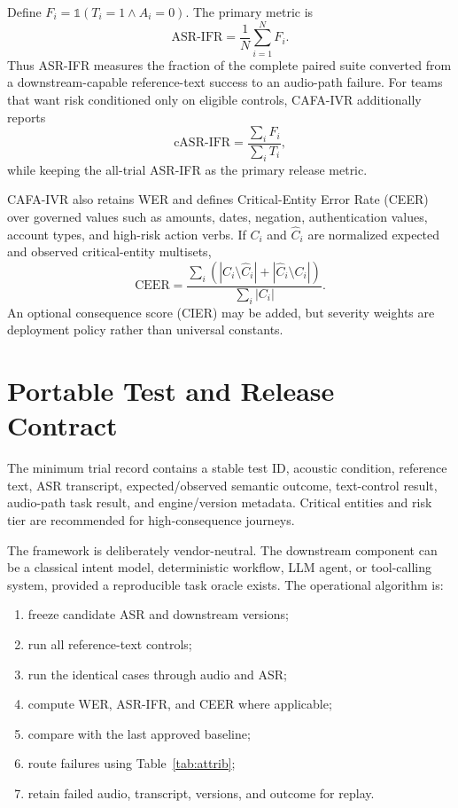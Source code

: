 \documentclass[9pt,twocolumn]{extarticle}
\begin{document}
Define $F_i=\mathbb{1}(T_i=1\land A_i=0)$. The primary metric is
\begin{equation}
\mathrm{ASR\mbox{-}IFR}=\frac{1}{N}\sum_{i=1}^{N}F_i.
\end{equation}
Thus ASR-IFR measures the fraction of the complete paired suite converted from a downstream-capable reference-text success to an audio-path failure. For teams that want risk conditioned only on eligible controls, CAFA-IVR additionally reports
\begin{equation}
\mathrm{cASR\mbox{-}IFR}=\frac{\sum_i F_i}{\sum_i T_i},
\end{equation}
while keeping the all-trial ASR-IFR as the primary release metric.

CAFA-IVR also retains WER and defines Critical-Entity Error Rate (CEER) over governed values such as amounts, dates, negation, authentication values, account types, and high-risk action verbs. If $C_i$ and $\hat C_i$ are normalized expected and observed critical-entity multisets,
\begin{equation}
\mathrm{CEER}=\frac{\sum_i (|C_i\setminus\hat C_i|+|\hat C_i\setminus C_i|)}{\sum_i |C_i|}.
\end{equation}
An optional consequence score (CIER) may be added, but severity weights are deployment policy rather than universal constants.

\section{Portable Test and Release Contract}
The minimum trial record contains a stable test ID, acoustic condition, reference text, ASR transcript, expected/observed semantic outcome, text-control result, audio-path task result, and engine/version metadata. Critical entities and risk tier are recommended for high-consequence journeys.

The framework is deliberately vendor-neutral. The downstream component can be a classical intent model, deterministic workflow, LLM agent, or tool-calling system, provided a reproducible task oracle exists. The operational algorithm is:

\begin{enumerate}
\item freeze candidate ASR and downstream versions;
\item run all reference-text controls;
\item run the identical cases through audio and ASR;
\item compute WER, ASR-IFR, and CEER where applicable;
\item compare with the last approved baseline;
\item route failures using Table~\ref{tab:attrib};
\item retain failed audio, transcript, versions, and outcome for replay.
\end{enumerate}
\end{document}
